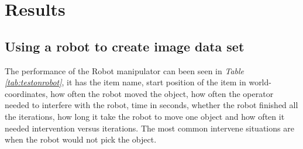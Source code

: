 \chapter{Results}

\section{Using a robot to create image data set}\label{resrobotcontrol}
The performance of the Robot manipulator can been seen in \textit{Table \ref{tab:testonrobot}}, it has the item name, start position of the item in world-coordinates, how often the robot moved the object, how often the operator needed to interfere with the robot, time in seconds, whether the robot finished all the iterations, how long it take the robot to move one object and how often it needed intervention versus iterations. The most common intervene situations are when the robot would not pick the object.
\vspace{1cm}
